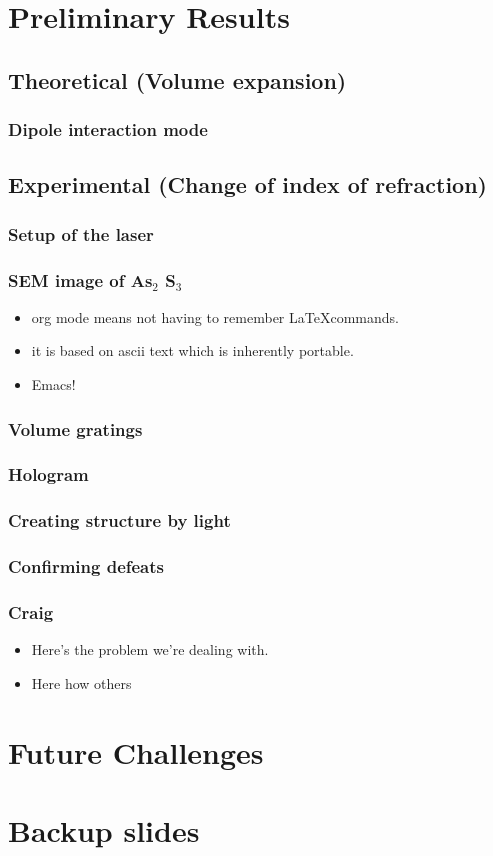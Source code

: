 \documentclass[bigger, english, 10pt, presentation]{beamer}
\begin{document}
\section{Preliminary Results}
\label{sec-2}
\subsection{Theoretical (Volume expansion)}
\label{sec-2-1}
\begin{frame}
\frametitle{Dipole interaction mode}
\label{sec-2-1-1}
\end{frame}
\subsection{Experimental (Change of index of refraction)}
\label{sec-2-2}
\begin{frame}
\frametitle{Setup of the laser}
\label{sec-2-2-1}
\end{frame}
\begin{frame}
\frametitle{SEM image of As$_2$ S$_3$}
\label{sec-2-2-2}
\begin{theorem}
\label{sec-2-2-2-1}

\begin{itemize}
\item org mode means not having to remember \LaTeX commands.
\item it is based on ascii text which is inherently portable.
\item Emacs!
\end{itemize}
\end{theorem}
\end{frame}
\begin{frame}
\frametitle{Volume gratings}
\label{sec-3-1}
\end{frame}
\begin{frame}
\frametitle{Hologram}
\label{sec-3-2}
\end{frame}
\begin{frame}
\frametitle{Creating structure by light}
\label{sec-3-3}
\end{frame}
\begin{frame}
\frametitle{Confirming defeats}
\label{sec-3-4}
\end{frame}
\begin{frame}
\frametitle{Craig}
\label{sec-4-1}

\begin{itemize}
\item Here's the problem we're dealing with.
\item Here how others
\end{itemize}
\end{frame}
\section{Future Challenges}
\label{sec-3}
\section{Backup slides}
\label{sec-4}
\end{document}
